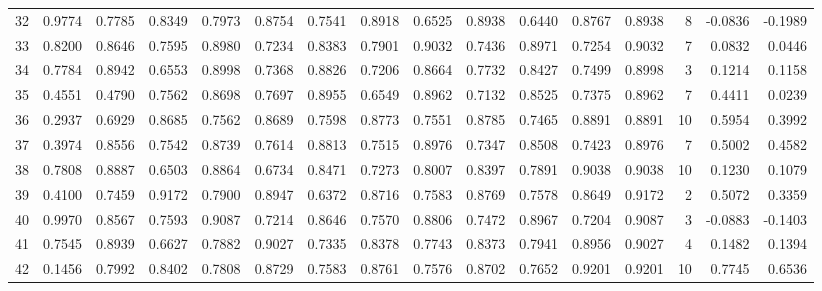 \begin{tabular}{lrrrrrrrrrrrrrrr}
32  &      0.9774 &  0.7785 &  0.8349 &  0.7973 &  0.8754 &  0.7541 &  0.8918 &  0.6525 &  0.8938 &  0.6440 &   0.8767 &     0.8938 &      8 &                   -0.0836 &                    -0.1989 \\
33  &      0.8200 &  0.8646 &  0.7595 &  0.8980 &  0.7234 &  0.8383 &  0.7901 &  0.9032 &  0.7436 &  0.8971 &   0.7254 &     0.9032 &      7 &                    0.0832 &                     0.0446 \\
34  &      0.7784 &  0.8942 &  0.6553 &  0.8998 &  0.7368 &  0.8826 &  0.7206 &  0.8664 &  0.7732 &  0.8427 &   0.7499 &     0.8998 &      3 &                    0.1214 &                     0.1158 \\
35  &      0.4551 &  0.4790 &  0.7562 &  0.8698 &  0.7697 &  0.8955 &  0.6549 &  0.8962 &  0.7132 &  0.8525 &   0.7375 &     0.8962 &      7 &                    0.4411 &                     0.0239 \\
36  &      0.2937 &  0.6929 &  0.8685 &  0.7562 &  0.8689 &  0.7598 &  0.8773 &  0.7551 &  0.8785 &  0.7465 &   0.8891 &     0.8891 &     10 &                    0.5954 &                     0.3992 \\
37  &      0.3974 &  0.8556 &  0.7542 &  0.8739 &  0.7614 &  0.8813 &  0.7515 &  0.8976 &  0.7347 &  0.8508 &   0.7423 &     0.8976 &      7 &                    0.5002 &                     0.4582 \\
38  &      0.7808 &  0.8887 &  0.6503 &  0.8864 &  0.6734 &  0.8471 &  0.7273 &  0.8007 &  0.8397 &  0.7891 &   0.9038 &     0.9038 &     10 &                    0.1230 &                     0.1079 \\
39  &      0.4100 &  0.7459 &  0.9172 &  0.7900 &  0.8947 &  0.6372 &  0.8716 &  0.7583 &  0.8769 &  0.7578 &   0.8649 &     0.9172 &      2 &                    0.5072 &                     0.3359 \\
40  &      0.9970 &  0.8567 &  0.7593 &  0.9087 &  0.7214 &  0.8646 &  0.7570 &  0.8806 &  0.7472 &  0.8967 &   0.7204 &     0.9087 &      3 &                   -0.0883 &                    -0.1403 \\
41  &      0.7545 &  0.8939 &  0.6627 &  0.7882 &  0.9027 &  0.7335 &  0.8378 &  0.7743 &  0.8373 &  0.7941 &   0.8956 &     0.9027 &      4 &                    0.1482 &                     0.1394 \\
42  &      0.1456 &  0.7992 &  0.8402 &  0.7808 &  0.8729 &  0.7583 &  0.8761 &  0.7576 &  0.8702 &  0.7652 &   0.9201 &     0.9201 &     10 &                    0.7745 &                     0.6536 \\

\end{tabular}
